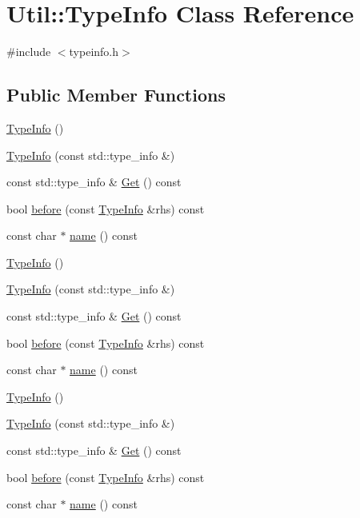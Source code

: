 \hypertarget{classUtil_1_1TypeInfo}{}\section{Util\+:\+:Type\+Info Class Reference}
\label{classUtil_1_1TypeInfo}


{\ttfamily \#include $<$typeinfo.\+h$>$}

\subsection*{Public Member Functions}
\begin{DoxyCompactItemize}
\item 
\mbox{\hyperlink{classUtil_1_1TypeInfo_a27c20c8fb4cee4c6af25901aa86c2c8e}{Type\+Info}} ()
\item 
\mbox{\hyperlink{classUtil_1_1TypeInfo_a71cf2dcfbc30380d9fcd866b1d685f34}{Type\+Info}} (const std\+::type\+\_\+info \&)
\item 
const std\+::type\+\_\+info \& \mbox{\hyperlink{classUtil_1_1TypeInfo_ad5aa0be0eb3620266822b8c55bd43ce7}{Get}} () const
\item 
bool \mbox{\hyperlink{classUtil_1_1TypeInfo_a016c2263e881e81b956718c6571ac637}{before}} (const \mbox{\hyperlink{classUtil_1_1TypeInfo}{Type\+Info}} \&rhs) const
\item 
const char $\ast$ \mbox{\hyperlink{classUtil_1_1TypeInfo_a0b8817efd5836d63f3d2ac808858dadb}{name}} () const
\item 
\mbox{\hyperlink{classUtil_1_1TypeInfo_a27c20c8fb4cee4c6af25901aa86c2c8e}{Type\+Info}} ()
\item 
\mbox{\hyperlink{classUtil_1_1TypeInfo_a71cf2dcfbc30380d9fcd866b1d685f34}{Type\+Info}} (const std\+::type\+\_\+info \&)
\item 
const std\+::type\+\_\+info \& \mbox{\hyperlink{classUtil_1_1TypeInfo_af201eec5ca4934cd5d8312d6458ec605}{Get}} () const
\item 
bool \mbox{\hyperlink{classUtil_1_1TypeInfo_a016c2263e881e81b956718c6571ac637}{before}} (const \mbox{\hyperlink{classUtil_1_1TypeInfo}{Type\+Info}} \&rhs) const
\item 
const char $\ast$ \mbox{\hyperlink{classUtil_1_1TypeInfo_ae6ca4a05f56329034b44fff495170737}{name}} () const
\item 
\mbox{\hyperlink{classUtil_1_1TypeInfo_a27c20c8fb4cee4c6af25901aa86c2c8e}{Type\+Info}} ()
\item 
\mbox{\hyperlink{classUtil_1_1TypeInfo_a71cf2dcfbc30380d9fcd866b1d685f34}{Type\+Info}} (const std\+::type\+\_\+info \&)
\item 
const std\+::type\+\_\+info \& \mbox{\hyperlink{classUtil_1_1TypeInfo_af201eec5ca4934cd5d8312d6458ec605}{Get}} () const
\item 
bool \mbox{\hyperlink{classUtil_1_1TypeInfo_a016c2263e881e81b956718c6571ac637}{before}} (const \mbox{\hyperlink{classUtil_1_1TypeInfo}{Type\+Info}} \&rhs) const
\item 
const char $\ast$ \mbox{\hyperlink{classUtil_1_1TypeInfo_ae6ca4a05f56329034b44fff495170737}{name}} () const
\end{DoxyCompactItemize}


